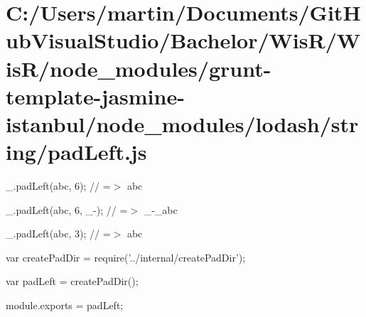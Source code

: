 \hypertarget{_c_1_2_users_2martin_2_documents_2_git_hub_visual_studio_2_bachelor_2_wis_r_2_wis_r_2node_module7f093bd36825d1b396429934a5db1a86}{}\section{C\+:/\+Users/martin/\+Documents/\+Git\+Hub\+Visual\+Studio/\+Bachelor/\+Wis\+R/\+Wis\+R/node\+\_\+modules/grunt-\/template-\/jasmine-\/istanbul/node\+\_\+modules/lodash/string/pad\+Left.\+js}
\+\_\+.\+pad\+Left(\textquotesingle{}abc\textquotesingle{}, 6); // =$>$ \textquotesingle{} abc\textquotesingle{}

\+\_\+.\+pad\+Left(\textquotesingle{}abc\textquotesingle{}, 6, \textquotesingle{}\+\_\+-\/\textquotesingle{}); // =$>$ \textquotesingle{}\+\_\+-\/\+\_\+abc\textquotesingle{}

\+\_\+.\+pad\+Left(\textquotesingle{}abc\textquotesingle{}, 3); // =$>$ \textquotesingle{}abc\textquotesingle{}


\begin{DoxyCodeInclude}
var createPadDir = require(\textcolor{stringliteral}{'../internal/createPadDir'});

var padLeft = createPadDir();

module.exports = padLeft;
\end{DoxyCodeInclude}
 